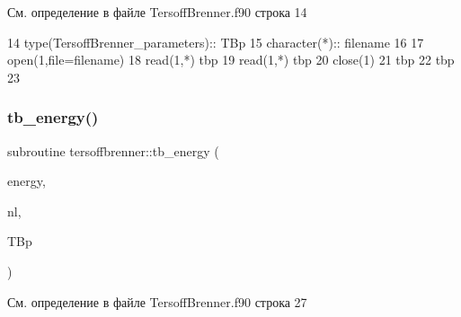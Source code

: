 См. определение в файле Tersoff\+Brenner.\+f90 строка 14


\begin{DoxyCode}
14     \textcolor{keywordtype}{type}(TersoffBrenner\_parameters):: TBp
15     \textcolor{keywordtype}{character(*)}::  filename
16     
17     \textcolor{keyword}{open}(1,file=filename)
18     \textcolor{keyword}{read}(1,*) tbp%
19     \textcolor{keyword}{read}(1,*) tbp%
20     \textcolor{keyword}{close}(1)
21     tbp%
22     tbp%
23     
\end{DoxyCode}
\mbox{\label{namespacetersoffbrenner_a273a6849892363697886b1f1d0f8df93}} 
\subsubsection{\texorpdfstring{tb\+\_\+energy()}{tb\_energy()}}
{\footnotesize\ttfamily subroutine tersoffbrenner\+::tb\+\_\+energy (\begin{DoxyParamCaption}\item[{real}]{energy,  }\item[{type(\mbox{\hyperlink{structmd__general_1_1neighbour__list}{neighbour\+\_\+list}})}]{nl,  }\item[{type(\mbox{\hyperlink{structtersoffbrenner_1_1tersoffbrenner__parameters}{tersoffbrenner\+\_\+parameters}})}]{T\+Bp }\end{DoxyParamCaption})}



См. определение в файле Tersoff\+Brenner.\+f90 строка 27


